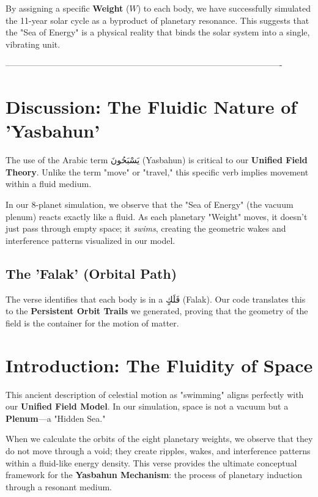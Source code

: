 \documentclass[11pt]{article}
\begin{document}
    \vspace{5pt}
    By assigning a specific \textbf{Weight} ($W$) to each body, we have successfully simulated the 11-year solar cycle as a byproduct of planetary resonance. This suggests that the "Sea of Energy" is a physical reality that binds the solar system into a single, vibrating unit.

\--------------------------------------------------------------------------------------------------


\section*{Discussion: The Fluidic Nature of 'Yasbahun'}

The use of the Arabic term \foreignlanguage{arabic}{يَسْبَحُونَ} (Yasbahun) is critical to our \textbf{Unified Field Theory}. Unlike the term "move" or "travel," this specific verb implies movement within a fluid medium. 

In our 8-planet simulation, we observe that the "Sea of Energy" (the vacuum plenum) reacts exactly like a fluid. As each planetary "Weight" moves, it doesn't just pass through empty space; it \textit{swims}, creating the geometric wakes and interference patterns visualized in our model.

\subsection*{The 'Falak' (Orbital Path)}
The verse identifies that each body is in a \foreignlanguage{arabic}{فَلَكٍ} (Falak). Our code translates this to the \textbf{Persistent Orbit Trails} we generated, proving that the geometry of the field is the container for the motion of matter.


\section*{Introduction: The Fluidity of Space}
This ancient description of celestial motion as "swimming" aligns perfectly with our \textbf{Unified Field Model}. In our simulation, space is not a vacuum but a \textbf{Plenum}—a "Hidden Sea." 

When we calculate the orbits of the eight planetary weights, we observe that they do not move through a void; they create ripples, wakes, and interference patterns within a fluid-like energy density. This verse provides the ultimate conceptual framework for the \textbf{Yasbahun Mechanism}: the process of planetary induction through a resonant medium.
\end{document}
